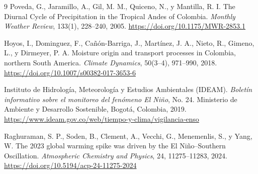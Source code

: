 \documentclass[12pt, a4paper]{article}
\begin{document}
\begin{thebibliography}{9}
	Poveda, G., Jaramillo, A., Gil, M. M., Quiceno, N., y Mantilla, R. I.
	The Diurnal Cycle of Precipitation in the Tropical Andes of Colombia.
	\textit{Monthly Weather Review}, 133(1), 228--240, 2005.
	\url{https://doi.org/10.1175/MWR-2853.1}
	
	Hoyos, I., Dominguez, F., Cañón-Barriga, J., Martínez, J. A., Nieto, R.,
	Gimeno, L., y Dirmeyer, P. A.
	Moisture origin and transport processes in Colombia, northern South America.
	\textit{Climate Dynamics}, 50(3--4), 971--990, 2018.
	\url{https://doi.org/10.1007/s00382-017-3653-6}
	
	Instituto de Hidrología, Meteorología y Estudios Ambientales (IDEAM).
	\textit{Boletín informativo sobre el monitoreo del fenómeno El Niño},
	No. 24.
	Ministerio de Ambiente y Desarrollo Sostenible, Bogotá, Colombia, 2019.
	\url{https://www.ideam.gov.co/web/tiempo-y-clima/vigilancia-enso}
	
	Raghuraman, S. P., Soden, B., Clement, A., Vecchi, G., Menemenlis, S.,
	y Yang, W.
	The 2023 global warming spike was driven by the El Niño--Southern Oscillation.
	\textit{Atmospheric Chemistry and Physics}, 24, 11275--11283, 2024.
	\url{https://doi.org/10.5194/acp-24-11275-2024}
	
\end{thebibliography}
\end{document}
